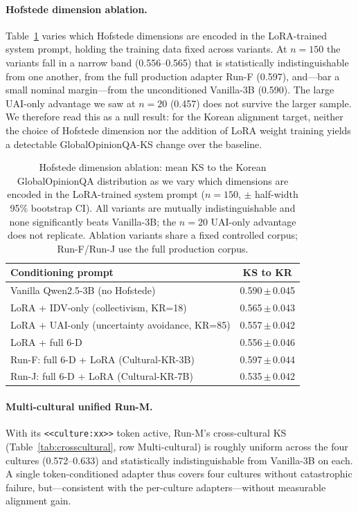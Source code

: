\documentclass{article}
\begin{document}
\paragraph{Hofstede dimension ablation.}
Table~\ref{tab:hofstede} varies which Hofstede dimensions are encoded in the LoRA-trained system prompt, holding the training data fixed across variants. At $n=150$ the variants fall in a narrow band (0.556--0.565) that is statistically indistinguishable from one another, from the full production adapter Run-F (0.597), and---bar a small nominal margin---from the unconditioned Vanilla-3B (0.590). The large UAI-only advantage we saw at $n=20$ (0.457) does not survive the larger sample. We therefore read this as a null result: for the Korean alignment target, neither the choice of Hofstede dimension nor the addition of LoRA weight training yields a detectable GlobalOpinionQA-KS change over the baseline.

\begin{table}[t]
\centering
\small
\caption{Hofstede dimension ablation: mean KS to the Korean GlobalOpinionQA distribution as we vary which dimensions are encoded in the LoRA-trained system prompt ($n=150$, $\pm$ half-width 95\% bootstrap CI). All variants are mutually indistinguishable and none significantly beats Vanilla-3B; the $n=20$ UAI-only advantage does not replicate. Ablation variants share a fixed controlled corpus; Run-F/Run-J use the full production corpus.}
\label{tab:hofstede}
\begin{tabular}{lc}
\toprule
Conditioning prompt & KS to KR \\
\midrule
Vanilla Qwen2.5-3B (no Hofstede) & 0.590\,$\pm$\,0.045 \\
LoRA + IDV-only (collectivism, KR=18) & 0.565\,$\pm$\,0.043 \\
LoRA + UAI-only (uncertainty avoidance, KR=85) & 0.557\,$\pm$\,0.042 \\
LoRA + full 6-D & 0.556\,$\pm$\,0.046 \\
Run-F: full 6-D + LoRA (Cultural-KR-3B) & 0.597\,$\pm$\,0.044 \\
Run-J: full 6-D + LoRA (Cultural-KR-7B) & 0.535\,$\pm$\,0.042 \\
\bottomrule
\end{tabular}
\end{table}

\paragraph{Multi-cultural unified Run-M.}
With its \texttt{<<culture:xx>>} token active, Run-M's cross-cultural KS (Table~\ref{tab:crosscultural}, row Multi-cultural) is roughly uniform across the four cultures (0.572--0.633) and statistically indistinguishable from Vanilla-3B on each. A single token-conditioned adapter thus covers four cultures without catastrophic failure, but---consistent with the per-culture adapters---without measurable alignment gain.
\end{document}
